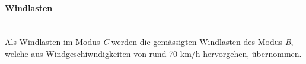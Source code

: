 \paragraph{Windlasten}\mbox{}\\
Als Windlasten im Modus \emph{C} werden die gemässigten Windlasten des Modus \emph{B}, welche aus Windgeschiwndigkeiten von rund 70 km/h hervorgehen, übernommen.


